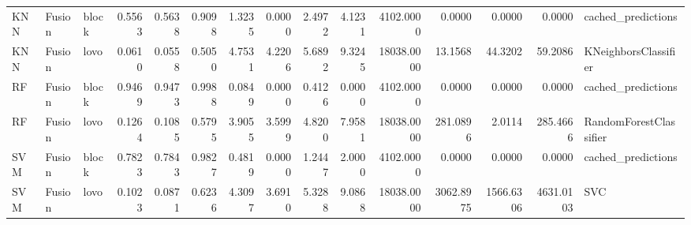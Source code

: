 \begin{tabular}{lllrrrrrrrrrrrl}
KNN & Fusion & block & 0.5563 & 0.5638 & 0.9098 & 1.3235 & 0.0000 & 2.4972 & 4.1231 & 4102.0000 & 0.0000 & 0.0000 & 0.0000 & cached_predictions \\
KNN & Fusion & lovo & 0.0610 & 0.0558 & 0.5050 & 4.7531 & 4.2206 & 5.6892 & 9.3245 & 18038.0000 & 13.1568 & 44.3202 & 59.2086 & KNeighborsClassifier \\
RF & Fusion & block & 0.9469 & 0.9473 & 0.9988 & 0.0849 & 0.0000 & 0.4126 & 0.0000 & 4102.0000 & 0.0000 & 0.0000 & 0.0000 & cached_predictions \\
RF & Fusion & lovo & 0.1264 & 0.1085 & 0.5795 & 3.9055 & 3.5999 & 4.8200 & 7.9581 & 18038.0000 & 281.0896 & 2.0114 & 285.4666 & RandomForestClassifier \\
SVM & Fusion & block & 0.7823 & 0.7843 & 0.9827 & 0.4819 & 0.0000 & 1.2447 & 2.0000 & 4102.0000 & 0.0000 & 0.0000 & 0.0000 & cached_predictions \\
SVM & Fusion & lovo & 0.1023 & 0.0871 & 0.6236 & 4.3097 & 3.6910 & 5.3288 & 9.0868 & 18038.0000 & 3062.8975 & 1566.6306 & 4631.0103 & SVC \\
\bottomrule
\end{tabular}
